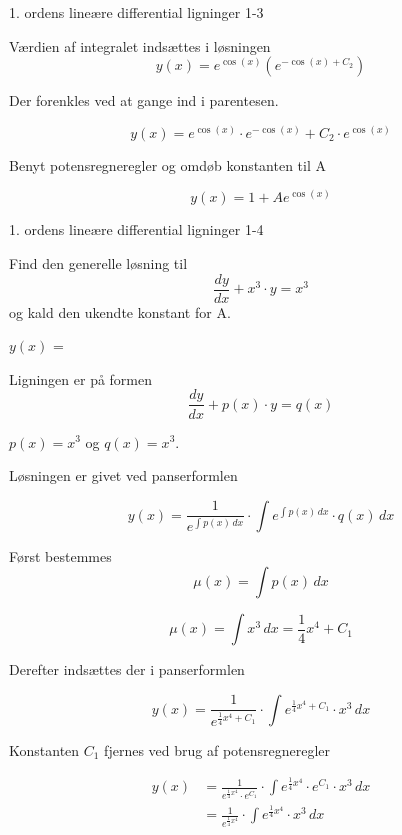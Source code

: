 \documentclass{article}
\begin{document}
\begin{exercise}{1. ordens lineære differential ligninger 1-3}
	\hint
	
	Værdien af integralet indsættes i løsningen
	\[
	y(x) = e^{\cos(x)} \left( e^{- \cos(x) + C_2}\right)
	\]
	
	\hint
	
	Der forenkles ved at gange ind i parentesen.
	
	\hint
	\[
	y(x) = e^{\cos(x)} \cdot e^{- \cos(x)} + C_2 \cdot e^{\cos(x)} 
	\]
	
	\hint
	
	Benyt potensregneregler og omdøb konstanten til A
	
	\hint
	\[
	y(x) = 1 + A e^{\cos(x)}
	\]
	
	
\end{exercise}

\newpage

\begin{exercise}{1. ordens lineære differential ligninger 1-4}
	
	
	Find den generelle løsning til
	\[
	\frac{dy}{dx} + x^3 \cdot y = x^3
	\]
	og kald den ukendte konstant for A.
	
	$y(x)$ =  
	
	
	
	\hint
	
	Ligningen er på formen
	\[
	\frac{dy}{dx} + p(x) \cdot y = q(x)
	\]
	
	\hint
	
	$p(x)=x^3$ og $q(x)=x^3$.
	
	\hint
	
	Løsningen er givet ved panserformlen
	
	
	\hint
	
	\[
	y(x) = \frac{1}{e^{\int p(x) \, dx}} \cdot \int e^{\int p(x) \, dx}  \cdot q(x) \, dx
	\]
	
	\hint
	
	Først bestemmes 
	\[
	\mu(x) = \int p(x) \, dx
	\]
	
	\hint
	\[
	\mu(x) = \int x^3 \, dx = \frac{1}{4} x^4 + C_1
	\]
	
	\hint
	Derefter indsættes der i  panserformlen
	
	\hint
	
	\[
	y(x) = \frac{1}{e^{\frac{1}{4}x^4 + C_1}} \cdot \int e^{\frac{1}{4}x^4 + C_1}  \cdot x^3 \, dx
	\]
	
	
	\hint
	
	Konstanten $C_1$ fjernes ved brug af potensregneregler
	
	\hint
	\begin{align*}
	y(x) &= \frac{1}{e^{\frac{1}{4}x^4} \cdot e^{C_1}} \cdot \int e^{\frac{1}{4}x^4} \cdot e^{C_1}  \cdot x^3 \, dx  \\
	&= \frac{1}{e^{\frac{1}{4}x^4}} \cdot \int e^{\frac{1}{4}x^4}  \cdot x^3 \, dx
	\end{align*}
	

\end{exercise}
\end{document}
